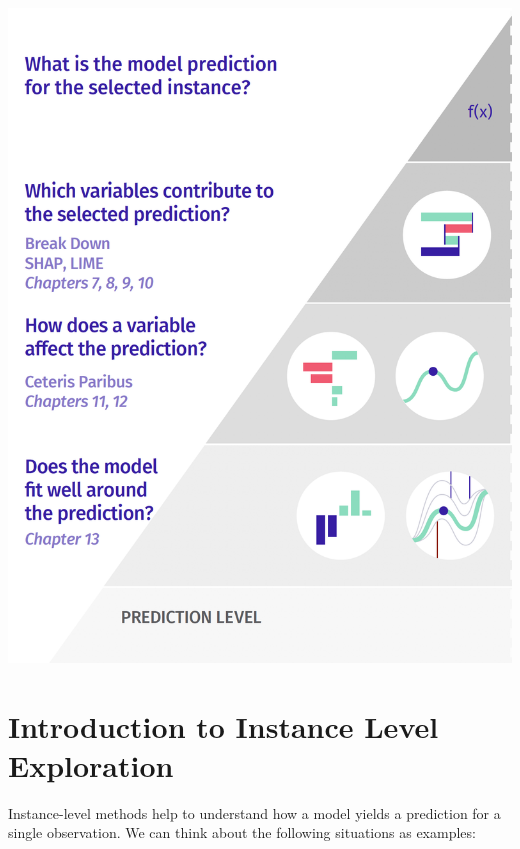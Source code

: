 \documentclass[12pt,]{krantz}
\begin{document}
\begin{center}\includegraphics[width=0.99\linewidth]{figure/UMEPpiramideInstance} \end{center}

\hypertarget{InstanceLevelExploration}{%
\section{Introduction to Instance Level Exploration}\label{InstanceLevelExploration}}

Instance-level methods help to understand how a model yields a prediction for a single observation. We can think about the following situations as examples:
\end{document}
